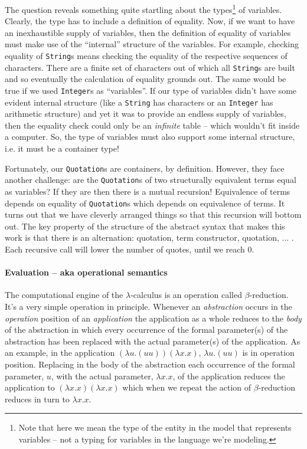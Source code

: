 The question reveals something quite startling about the types\footnote{Note that here we mean the type of the entity in the model that represents variables -- not a typing for variables in the language we're modeling.} of
variables. Clearly, the type has to include a definition of
equality. Now, if we want to have an inexhaustible supply of
variables, then the definition of equality of variables must make use
of the ``internal'' structure of the variables. For example, checking
equality of \lstinline[language=Scala]!String!s means checking the
equality of the respective sequences of characters. There are a finite
set of characters out of which all \lstinline[language=Scala]!String!s
are built and so eventually the calculation of equality grounds
out. The same would be true if we used
\lstinline[language=Scala]!Integer!s as ``variables''. If our type of
variables didn't have some evident internal structure (like a
\lstinline[language=Scala]!String! has characters or an
\lstinline[language=Scala]!Integer! has arithmetic structure) and yet
it was to provide an endless supply of variables, then the equality
check could only be an \emph{infinite} table -- which wouldn't fit
inside a computer. So, the type of variables must also support some
internal structure, i.e. it must be a container type!

Fortunately, our \lstinline[language=Scala]!Quotation!s are
containers, by definition. However, they face another challenge: are
the \lstinline[language=Scala]!Quotation!s of two structurally
equivalent terms equal as variables? If they are then there is a
mutual recursion! Equivalence of terms depends on equality of
\lstinline[language=Scala]!Quotation!s which depends on equivalence of
terms. It turns out that we have cleverly arranged things so that this
recursion will bottom out. The key property of the structure of the
abstract syntax that makes this work is that there is an alternation:
quotation, term constructor, quotation, ... . Each recursive call will
lower the number of quotes, until we reach 0.

\paragraph{Evaluation -- aka operational semantics}

The computational engine of the $\lambda$-calculus is an operation
called $\beta$-reduction. It's a very simple operation in
principle. Whenever an \emph{abstraction} occurs in the
\emph{operation} position of an \emph{application} the application as
a whole reduces to the \emph{body} of the abstraction in which every
occurrence of the formal parameter(s) of the abstraction has been
replaced with the actual parameter(s) of the application. As an
example, in the application $(\lambda u.(u u))(\lambda x.x)$, $\lambda
u.(u u)$ is in operation position. Replacing in the body of the
abstraction each occurrence of the formal parameter, $u$, with the
actual parameter, $\lambda x.x$, of the application reduces the
application to $(\lambda x.x)(\lambda x.x)$ which when we repeat the
action of $\beta$-reduction reduces in turn to $\lambda x.x$.

